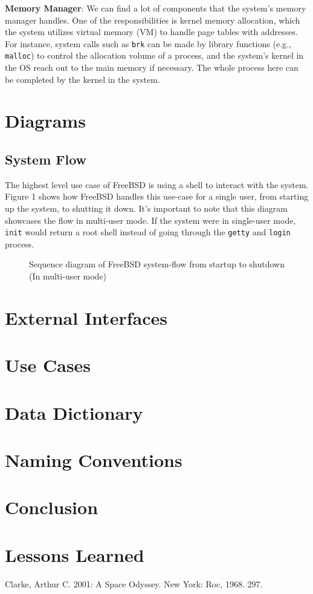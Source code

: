 \documentclass[12pt, dvipsnames, a4paper]{article}
\newcommand{\code}[1]{\texttt{#1}}
\begin{document}
\textbf{Memory Manager}: We can find a lot of components that the system’s memory manager handles. One of the responsibilities is kernel memory allocation, which the system utilizes virtual memory (VM) to handle page tables with addresses. For instance, system calls such as \code{brk} can be made by library functions (e.g., \code{malloc}) to control the allocation volume of a process, and the system’s kernel in the OS reach out to the main memory if necessary. The whole process here can be completed by the kernel in the system.\par


\section{Diagrams}

\subsection{System Flow}
The highest level use case of FreeBSD is using a shell to interact with the system.
Figure 1 shows how FreeBSD handles this use-case for a single user,
from starting up the system, to shutting it down. It's important to note that
this diagram showcases the flow in multi-user mode. If the system were in
single-user mode, \code{init} would return a root shell instead of going through the
\code{getty} and \code{login} process.

\begin{figure}[!htb]
	\advance\leftskip-0.5cm
	
	\caption{Sequence diagram of FreeBSD system-flow from startup to shutdown (In multi-user mode)}
\end{figure}


\section{External Interfaces}
\lipsum[1]

\section{Use Cases}
\lipsum[1]

\section{Data Dictionary}
\lipsum[1]

\section{Naming Conventions}
\lipsum[1]

\section{Conclusion}
\lipsum[1]

\section{Lessons Learned}
\lipsum[1]

\begin{thebibliography}{00}
	 Clarke, Arthur C. 2001: A Space Odyssey. New York: Roc, 1968. 297.
\end{thebibliography}
\end{document}
